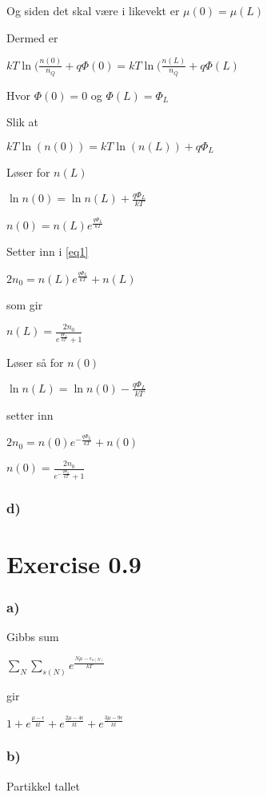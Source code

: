 \documentclass[12pt]{article}
\begin{document}
Og siden det skal være i likevekt er $\mu (0) = \mu (L)$

Dermed er

$kT\ln(\frac{n(0)}{n_Q} + q\Phi(0) = kT \ln(\frac{n(L)}{n_Q} + q\Phi(L)$ 

Hvor $\Phi(0) = 0$ og $\Phi(L) = \Phi_L$ 

Slik at 

$kT \ln(n(0)) = kT \ln(n(L)) +q\Phi_L$

Løser for $n(L)$

$\ln n(0) = \ln n(L) + \frac{q\Phi_L}{kT}$

$n(0) = n(L)e^{\frac{q\Phi_L}{kT}}$

Setter inn i \ref{eq1} 

$2n_0 = n(L)e^{\frac{q\Phi_L}{kT}} + n(L)$

som gir 

$n(L) = \frac{2n_0}{e^{\frac{q\Phi_L}{kT}} +1}$

Løser så for $n(0)$

$\ln n(L) = \ln n(0) - \frac{q\Phi_L}{kT}$

setter inn 

$2n_0 = n(0)e^{-\frac{q\Phi_L}{kT}} + n(0)$

$n(0) = \frac{2n_0}{e^{-\frac{q\Phi_L}{kT}} +1}$

\subsubsection*{d)}



\section*{Exercise 0.9}

\subsubsection*{a)}

Gibbs sum

$\sum_N \sum_{s(N)} e^{\frac{N\mu -\epsilon_{s(N)}}{kT}}$

gir 

$1 + e^{\frac{\mu - \epsilon}{kt}} + e^{\frac{2\mu - 4\epsilon}{kt}} + e^{\frac{3\mu - 9\epsilon}{kt}}$


\subsubsection*{b)}
Partikkel tallet 
\end{document}
